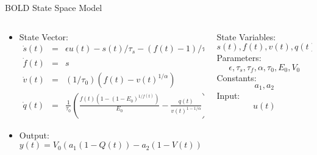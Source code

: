 \documentclass{beamer}
\begin{document}
\begin{frame}{BOLD State Space Model}
  \scriptsize
  \begin{columns}
  \begin{column}{.7\textwidth}
    \begin{itemize}
    \item State Vector:
    \begin{eqnarray}
    \dot{s}(t) &=& \epsilon u(t) - s(t)/\tau_s - (f(t)-1)/\tau_f \nonumber \\
    \dot{f}(t) &=& s \nonumber \\
    \dot{v}(t) &=& (1/\tau_0)( f(t) - v(t) ^ {1/\alpha}) \nonumber \\
    \dot{q}(t) &=& \frac{1}{\tau_0}\left(\frac{f(t)(1-(1-E_0)^{1/f(t)})}{E_0} -
            \frac{q(t)}{v(t)^{1-1/\alpha}}\right) \nonumber 
    \end{eqnarray}
    \item Output:
    $$y(t) = V_0(a_1( 1 - Q(t)) - a_2(1 - V(t)))$$
    \end{itemize}
  \end{column}

  \begin{column}{.3\textwidth}
        State Variables:
        $$s(t), f(t), v(t), q(t)$$
        Parameters:
        $$\epsilon, \tau_s, \tau_f, \alpha, \tau_0, E_0, V_0$$
        Constants:
        $$a_1, a_2$$
        Input:
        $$u(t)$$
  \end{column}
  \end{columns}
\end{frame}
\end{document}
